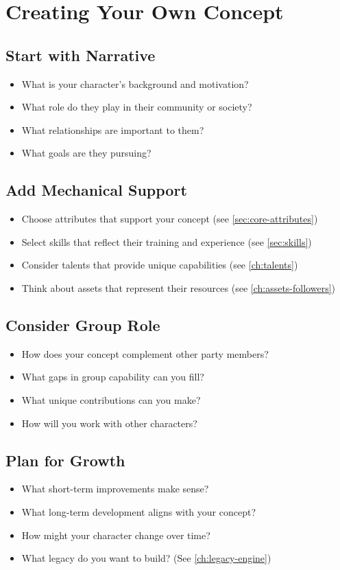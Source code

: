 \section{Creating Your Own Concept}
\label{sec:creating-own-concept}

\subsection*{Start with Narrative}
\begin{itemize}
\item What is your character's background and motivation?
\item What role do they play in their community or society?
\item What relationships are important to them?
\item What goals are they pursuing?
\end{itemize}

\subsection*{Add Mechanical Support}
\begin{itemize}
\item Choose attributes that support your concept (see \ref{sec:core-attributes})
\item Select skills that reflect their training and experience (see \ref{sec:skills})
\item Consider talents that provide unique capabilities (see \ref{ch:talents})
\item Think about assets that represent their resources (see \ref{ch:assets-followers})
\end{itemize}

\subsection*{Consider Group Role}
\begin{itemize}
\item How does your concept complement other party members?
\item What gaps in group capability can you fill?
\item What unique contributions can you make?
\item How will you work with other characters?
\end{itemize}

\subsection*{Plan for Growth}
\begin{itemize}
\item What short-term improvements make sense?
\item What long-term development aligns with your concept?
\item How might your character change over time?
\item What legacy do you want to build? (See \ref{ch:legacy-engine})
\end{itemize}

